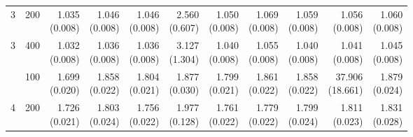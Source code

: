 \begin{table}[p]
{\begin{tabular}{llrrrrrrrrr}
3 & 200 & \shortstack{1.035\\(0.008)} & \shortstack{1.046\\(0.008)} & \shortstack{1.046\\(0.008)} & \shortstack{2.560\\(0.607)} & \shortstack{1.050\\(0.008)} & \shortstack{1.069\\(0.008)} & \shortstack{1.059\\(0.008)} & \shortstack{1.056\\(0.008)} & \shortstack{1.060\\(0.008)} \\
3 & 400 & \shortstack{1.032\\(0.008)} & \shortstack{1.036\\(0.008)} & \shortstack{1.036\\(0.008)} & \shortstack{3.127\\(1.304)} & \shortstack{1.040\\(0.008)} & \shortstack{1.055\\(0.008)} & \shortstack{1.040\\(0.008)} & \shortstack{1.041\\(0.008)} & \shortstack{1.045\\(0.008)} \\
\addlinespace
4 & 100 & \shortstack{1.699\\(0.020)} & \shortstack{1.858\\(0.022)} & \shortstack{1.804\\(0.021)} & \shortstack{1.877\\(0.030)} & \shortstack{1.799\\(0.021)} & \shortstack{1.861\\(0.022)} & \shortstack{1.858\\(0.022)} & \shortstack{37.906\\(18.661)} & \shortstack{1.879\\(0.024)} \\
4 & 200 & \shortstack{1.726\\(0.021)} & \shortstack{1.803\\(0.024)} & \shortstack{1.756\\(0.022)} & \shortstack{1.977\\(0.128)} & \shortstack{1.761\\(0.022)} & \shortstack{1.779\\(0.022)} & \shortstack{1.799\\(0.024)} & \shortstack{1.811\\(0.023)} & \shortstack{1.831\\(0.028)} \\

\end{tabular}}
\end{table}

